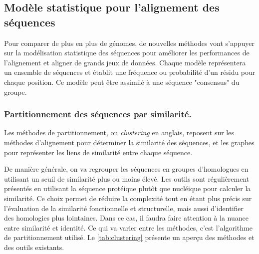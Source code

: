 \subsection{Modèle statistique pour l'alignement des séquences}

Pour comparer de plus en plus de génomes, de nouvelles méthodes vont s'appuyer sur la modélisation statistique des séquences pour améliorer les performances de l'alignement et aligner de grands jeux de données. Chaque modèle représentera un ensemble de séquences et établit une fréquence ou probabilité d'un résidu pour chaque position. Ce modèle peut être assimilé à une séquence "consensus" du groupe.

\subsubsection{Partitionnement des séquences par similarité. }
\label{sec:clustering}

Les méthodes de partitionnement, ou \textit{clustering} en anglais, reposent sur les méthodes d'alignement pour déterminer la similarité des séquences, et les graphes pour représenter les liens de similarité entre chaque séquence. 

De manière générale, on va regrouper les séquences en groupes d'homologues en utilisant un seuil de similarité plus ou moins élevé. Les outils sont régulièrement présentés en utilisant la séquence protéique plutôt que nucléique pour calculer la similarité. Ce choix permet de réduire la complexité tout en étant plus précis sur l'évaluation de la similarité fonctionnelle et structurelle, mais aussi d'identifier des homologies plus lointaines. Dans ce cas, il faudra faire attention à la nuance entre similarité et identité. Ce qui va varier entre les méthodes, c'est l'algorithme de partitionnement utilisé. Le \autoref{tab:clustering} présente un aperçu des méthodes et des outils existants.  

